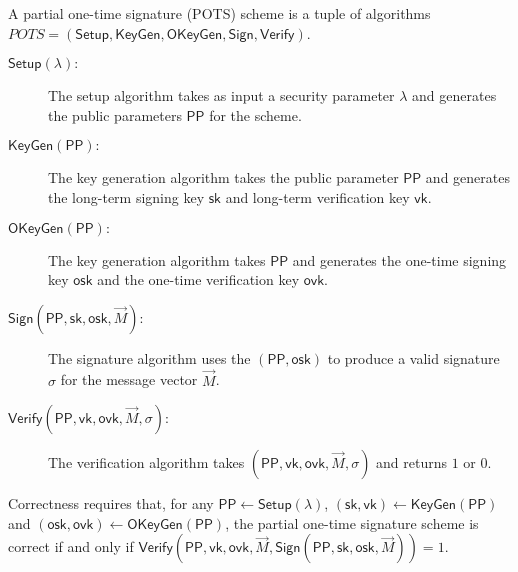 \documentclass[10pt]{llncs}
\newcommand{\sk}{\mathsf{sk}}
\newcommand{\vk}{\mathsf{vk}}
\newcommand{\ovk}{\mathsf{ovk}}
\newcommand{\osk}{\mathsf{osk}}
\newcommand{\Verif}{{\mathsf{Verify}}}
\newcommand{\PPP}{\mathsf{PP}}
\begin{document}
\begin{definition}
  A partial one-time signature (POTS) scheme is a tuple of algorithms $POTS = (\mathsf{Setup}, \mathsf{KeyGen}, \mathsf{OKeyGen}, \mathsf{Sign}, \mathsf{Verify})$.
  \begin{description}
  \item[\boldmath$\mathsf{Setup}(\lambda):$] 
    The setup algorithm takes as input a security parameter $\lambda$ and generates the public parameters $\PPP$ for the scheme.
  \item[\boldmath$\mathsf{KeyGen}(\PPP) :$]
    The key generation algorithm takes the public parameter $\PPP$ and generates the long-term signing key $\sk$ and long-term verification key $\vk$.
  \item[\boldmath$\mathsf{OKeyGen}(\PPP) :$] 
    The key generation algorithm takes $\PPP$ and generates the one-time signing key $\osk$ and the one-time verification key $\ovk$.
  \item[\boldmath$\mathsf{Sign}(\PPP, \sk, \osk, \vec{M}) :$] 
    The signature algorithm uses the $(\PPP, \osk)$ to produce a valid signature $\sigma$ for the message vector $\vec{M}$.
  \item[\boldmath$\mathsf{Verify}(\PPP, \vk, \ovk, \vec{M}, \sigma) :$] 
    The verification algorithm takes $(\PPP, \vk, \ovk, \vec{M}, \sigma)$ and returns $1$ or $0$.
  \end{description}
\end{definition}

Correctness requires that, for any $\PPP \gets \mathsf{Setup}(\lambda)$, $(\sk, \vk) \gets \mathsf{KeyGen}(\PPP)$ and $(\osk, \ovk) \gets \mathsf{OKeyGen}(\PPP)$,
the partial one-time signature scheme is correct if and only if  $\Verif(\PPP, \vk, \ovk, \vec{M}, \mathsf{Sign}(\PPP, \sk, \osk, \vec{M})) = 1$.
\end{document}

